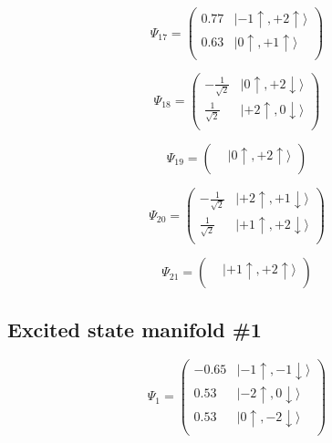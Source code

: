 \documentclass{article}
\begin{document}
\begin{equation}
\Psi_{17} = 
\begin{pmatrix}
      0.77  &  |-1\uparrow , +2\uparrow\rangle  \\
      0.63  &  |0\uparrow , +1\uparrow\rangle  \\
\end{pmatrix}
\end{equation}

\begin{equation}
\Psi_{18} = 
\begin{pmatrix}
-\frac{1}{\sqrt{2}}  &  |0\uparrow , +2\downarrow\rangle  \\
\frac{1}{\sqrt{2}}  &  |+2\uparrow , 0\downarrow\rangle  \\
\end{pmatrix}
\end{equation}

\begin{equation}
\Psi_{19} = 
\begin{pmatrix}
  &  |0\uparrow , +2\uparrow\rangle  \\
\end{pmatrix}
\end{equation}

\begin{equation}
\Psi_{20} = 
\begin{pmatrix}
-\frac{1}{\sqrt{2}}  &  |+2\uparrow , +1\downarrow\rangle  \\
\frac{1}{\sqrt{2}}  &  |+1\uparrow , +2\downarrow\rangle  \\
\end{pmatrix}
\end{equation}

\begin{equation}
\Psi_{21} = 
\begin{pmatrix}
  &  |+1\uparrow , +2\uparrow\rangle  \\
\end{pmatrix}
\end{equation}



\subsection{Excited state manifold \#1}


\begin{equation}
\Psi_{1} = 
\begin{pmatrix}
-      0.65  &  |-1\uparrow , -1\downarrow\rangle  \\
      0.53  &  |-2\uparrow , 0\downarrow\rangle  \\
      0.53  &  |0\uparrow , -2\downarrow\rangle  \\
\end{pmatrix}
\end{equation}
\end{document}
